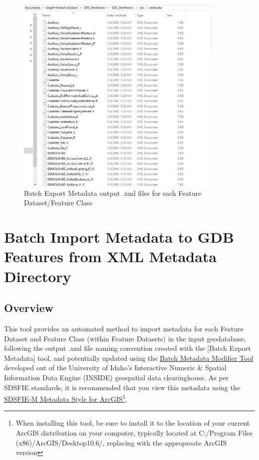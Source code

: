 \documentclass[openany]{book}
\let\rmarkdownfootnote\footnote%
\def\footnote{\protect\rmarkdownfootnote}
\theoremstyle{definition}
\theoremstyle{definition}
\theoremstyle{definition}
\theoremstyle{remark}
\begin{document}
\begin{figure}[H]

{\centering \includegraphics[width=3.93in,]{figures/exMeta-after} 

}

\caption{Batch Export Metadata output .xml files for each Feature Dataset/Feature Class}\label{fig:exMetaafter}
\end{figure}

\hypertarget{imMeta}{\chapter{Batch Import Metadata to GDB Features from
XML Metadata Directory}\label{imMeta}}

\section{Overview}\label{overview-12}

This tool provides an automated method to import metadata for each
Feature Dataset and Feature Class (within Feature Datasets) in the input
geodatabase, following the output .xml file naming convention created
with the {[}Batch Export Metadata{]} tool, and potentially updated using
the
\href{http://insideidaho.org/helpdocs/batch_metadata_modifier_tool.html}{Batch
Metadata Modifier Tool} developed out of the University of Idaho's
Interactive Numeric \& Spatial Information Data Engine (INSIDE)
geospatial data clearinghouse. As per SDSFIE standards, it is
recommended that you view this metadata using the
\href{https://www.sdsfieonline.org/Standards/Metadata}{SDSFIE-M Metadata
Style for ArcGIS}\footnote{When installing this tool, be sure to install
  it to the location of your current ArcGIS distribution on your
  computer, typically located at C:/Program Files
  (x86)/ArcGIS/Desktop10.6/, replacing with the approproate ArcGIS
  version}.
\end{document}
